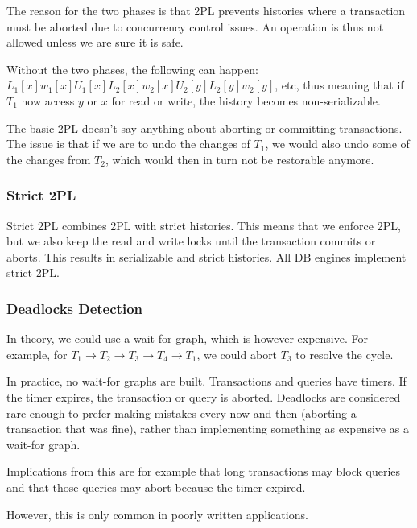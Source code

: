 The reason for the two phases is that 2PL prevents histories where a transaction must be aborted due to concurrency control issues.
An operation is thus not allowed unless we are sure it is safe.

Without the two phases, the following can happen:
$L_1[x] w_1[x] U_1[x] L_2[x] w_2[x] U_2[y] L_2[y] w_2[y]$, etc, thus meaning that if $T_1$ now access $y$ or $x$ for read or write, the history becomes non-serializable.

The basic 2PL doesn't say anything about aborting or committing transactions.
The issue is that if we are to undo the changes of $T_1$, we would also undo some of the changes from $T_2$, which would then in turn not be restorable anymore.

\subsubsection{Strict 2PL}
Strict 2PL combines 2PL with strict histories. This means that we enforce 2PL, but we also keep the read and write locks until the transaction commits or aborts.
This results in serializable and strict histories.
All DB engines implement strict 2PL.


\subsubsection{Deadlocks Detection}
In theory, we could use a wait-for graph, which is however expensive.
For example, for $T_1 \rightarrow T_2 \rightarrow T_3 \rightarrow T_4 \rightarrow T_1$, we could abort $T_3$ to resolve the cycle.

In practice, no wait-for graphs are built. Transactions and queries have timers. If the timer expires, the transaction or query is aborted.
Deadlocks are considered rare enough to prefer making mistakes every now and then (aborting a transaction that was fine),
rather than implementing something as expensive as a wait-for graph.

Implications from this are for example that long transactions may block queries and that those queries may abort because the timer expired.

However, this is only common in poorly written applications.
